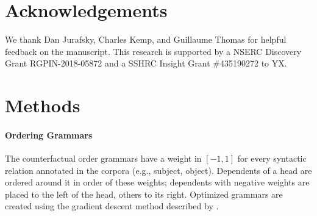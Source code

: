 \documentclass[11pt,a4paper]{article}
\begin{document}
\section*{Acknowledgements}
We thank Dan Jurafsky, Charles Kemp, and Guillaume Thomas for helpful feedback on the manuscript. This research is supported by a NSERC Discovery Grant RGPIN-2018-05872 and a SSHRC Insight Grant \#435190272 to YX.


\section*{Methods}





\paragraph{Ordering Grammars}

The counterfactual order grammars have a weight in $[-1, 1]$ for every syntactic relation annotated in the corpora (e.g., subject, object).
Dependents of a head are ordered around it in order of these weights; dependents with negative weights are placed to the left of the head, others to its right.
Optimized grammars are created using the gradient descent method described by \citep{hahn2020universals}.




\end{document}

